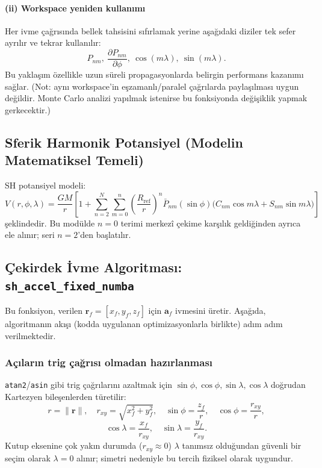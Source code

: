 \paragraph{(ii) Workspace yeniden kullanımı}
Her ivme çağrısında bellek tahsisini sıfırlamak yerine aşağıdaki diziler tek sefer ayrılır
ve tekrar kullanılır:
\[
P_{nm},\ \frac{\partial P_{nm}}{\partial \phi},\ \cos(m\lambda),\ \sin(m\lambda).
\]
Bu yaklaşım özellikle uzun süreli propagasyonlarda belirgin performans kazanımı sağlar.
(Not: aynı workspace’in eşzamanlı/paralel çağrılarda paylaşılması uygun değildir. Monte Carlo analizi yapılmak istenirse bu fonksiyonda değişiklik yapmak gerkecektir.)


\subsection*{Sferik Harmonik Potansiyel (Modelin Matematiksel Temeli)}

SH potansiyel modeli:
\begin{equation}
V(r,\phi,\lambda) = \frac{GM}{r}\left[1+\sum_{n=2}^{N}\sum_{m=0}^{n}
\left(\frac{R_\text{ref}}{r}\right)^n
\bar{P}_{nm}(\sin\phi)\bigl(C_{nm}\cos m\lambda + S_{nm}\sin m\lambda\bigr)\right]
\label{eq:sh_potential}
\end{equation}
şeklindedir.
Bu modülde $n=0$ terimi merkezî çekime karşılık geldiğinden ayrıca ele alınır; seri $n=2$’den başlatılır.


\newpage
\subsection*{Çekirdek İvme Algoritması: \texttt{sh\_accel\_fixed\_numba}}
\label{subsec:sh_accel_fixed_numba}

Bu fonksiyon, verilen $\mathbf r_f=[x_f,y_f,z_f]$ için $\mathbf a_f$ ivmesini üretir. Aşağıda, algoritmanın akışı (kodda uygulanan optimizasyonlarla birlikte) adım adım verilmektedir.

\subsubsection{Açıların trig çağrısı olmadan hazırlanması}

\texttt{atan2}/\texttt{asin} gibi trig çağrılarını azaltmak için
$\sin\phi,\cos\phi,\sin\lambda,\cos\lambda$ doğrudan Kartezyen bileşenlerden türetilir:
\[
r=\|\mathbf r\|,\quad r_{xy}=\sqrt{x_f^2+y_f^2},\quad
\sin\phi=\frac{z_f}{r},\quad \cos\phi=\frac{r_{xy}}{r},
\]
\[
\cos\lambda=\frac{x_f}{r_{xy}},\quad \sin\lambda=\frac{y_f}{r_{xy}}.
\]
Kutup eksenine çok yakın durumda ($r_{xy}\approx 0$) $\lambda$ tanımsız olduğundan
güvenli bir seçim olarak $\lambda=0$ alınır; simetri nedeniyle bu tercih fiziksel olarak uygundur.

